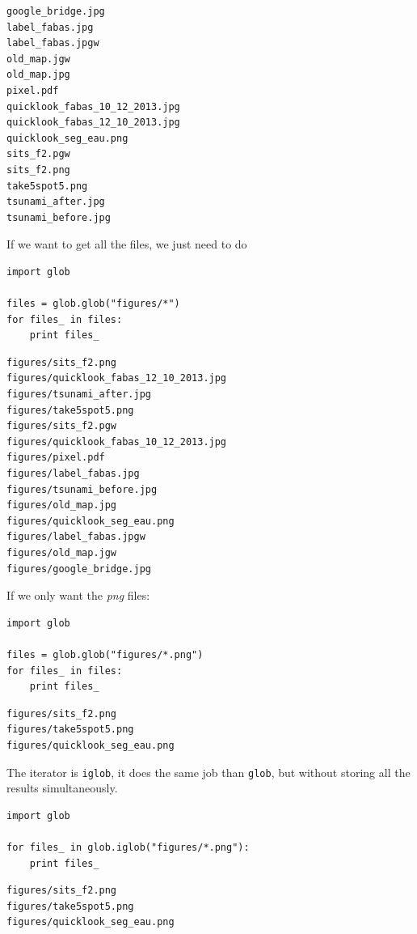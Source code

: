 \documentclass[a4paper,11pt,DIV=18]{scrartcl}
\begin{document}
\begin{verbatim}
google_bridge.jpg
label_fabas.jpg
label_fabas.jpgw
old_map.jgw
old_map.jpg
pixel.pdf
quicklook_fabas_10_12_2013.jpg
quicklook_fabas_12_10_2013.jpg
quicklook_seg_eau.png
sits_f2.pgw
sits_f2.png
take5spot5.png
tsunami_after.jpg
tsunami_before.jpg
\end{verbatim}

If we want to get all the files, we just need to do

\begin{verbatim}
import glob

files = glob.glob("figures/*")
for files_ in files:
    print files_
\end{verbatim}

\begin{verbatim}
figures/sits_f2.png
figures/quicklook_fabas_12_10_2013.jpg
figures/tsunami_after.jpg
figures/take5spot5.png
figures/sits_f2.pgw
figures/quicklook_fabas_10_12_2013.jpg
figures/pixel.pdf
figures/label_fabas.jpg
figures/tsunami_before.jpg
figures/old_map.jpg
figures/quicklook_seg_eau.png
figures/label_fabas.jpgw
figures/old_map.jgw
figures/google_bridge.jpg
\end{verbatim}

If we only want the \emph{png} files:

\begin{verbatim}
import glob

files = glob.glob("figures/*.png")
for files_ in files:
    print files_
\end{verbatim}

\begin{verbatim}
figures/sits_f2.png
figures/take5spot5.png
figures/quicklook_seg_eau.png
\end{verbatim}

The iterator is \texttt{iglob}, it does the same job than \texttt{glob}, but without storing all the results simultaneously.

\begin{verbatim}
import glob

for files_ in glob.iglob("figures/*.png"):
    print files_
\end{verbatim}

\begin{verbatim}
figures/sits_f2.png
figures/take5spot5.png
figures/quicklook_seg_eau.png
\end{verbatim}
\end{document}
